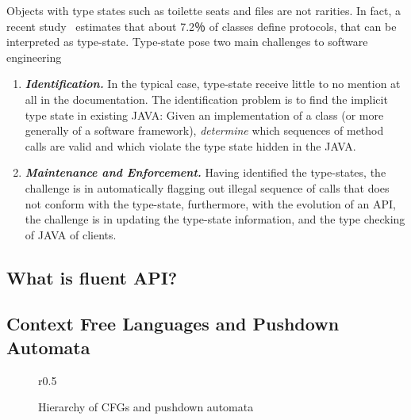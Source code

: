 Objects with type states such as toilette seats and files are not rarities.
In fact, a recent study~\cite{Beckman:2011} estimates
  that about 7.2％ of \Java classes define protocols, that can be interpreted as type-state.
Type-state pose two main challenges to software engineering
\begin{enumerate}
  \item \emph{\textbf{Identification.}}
    In the typical case, type-state
        receive little to no mention at all in the documentation.
    The identification problem is to find the implicit
    type state in existing JAVA: Given an implementation of a class
    (or more generally of a software framework),
    \emph{determine} which sequences of method calls are valid and which violate the
    type state hidden in the JAVA.
  \item \emph{\textbf{Maintenance and Enforcement.}}
    Having identified the type-states, the challenge is in automatically flagging out
      illegal sequence of calls that does not conform
      with the type-state, furthermore, with the
      evolution of an API, the challenge is in updating the type-state information,
      and the type checking of JAVA of clients.
\end{enumerate}

\subsection{What is fluent API?}

\subsection{Context Free Languages and Pushdown Automata}
\begin{wrapfigure}r{0.5\linewidth}
  \caption{Hierarchy of CFGs and pushdown automata}
  
\end{wrapfigure}
